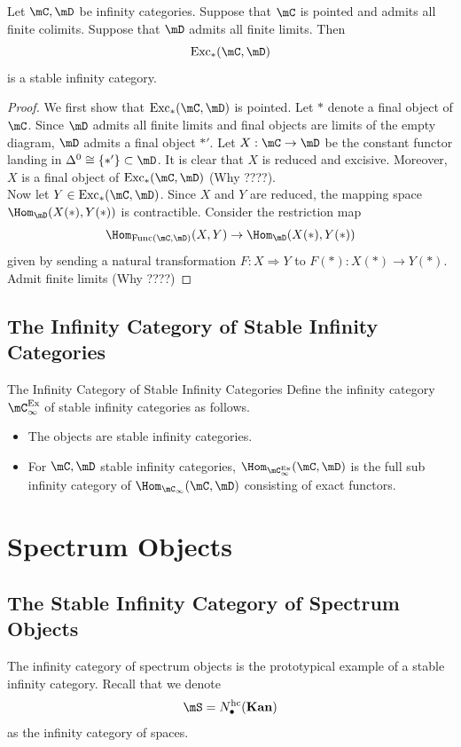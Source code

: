 \documentclass[a4paper]{article}
\begin{document}
\begin{prp}{}{} Let $\mC,\mD$ be infinity categories. Suppose that $\mC$ is pointed and admits all finite colimits. Suppose that $\mD$ admits all finite limits. Then $$\text{Exc}_\ast(\mC,\mD)$$ is a stable infinity category. 
\begin{proof}
We first show that $\text{Exc}_\ast(\mC,\mD)$ is pointed. Let $\ast$ denote a final object of $\mC$. Since $\mD$ admits all finite limits and final objects are limits of the empty diagram, $\mD$ admits a final object $\ast'$. Let $X:\mC\to\mD$ be the constant functor landing in $\Delta^0\cong\{\ast'\}\subset\mD$. It is clear that $X$ is reduced and excisive. Moreover, $X$ is a final object of $\text{Exc}_\ast(\mC,\mD)$ (Why ????). \\

Now let $Y\in\text{Exc}_\ast(\mC,\mD)$. Since $X$ and $Y$ are reduced, the mapping space $\Hom_\mD(X(\ast),Y(\ast))$ is contractible. Consider the restriction map $$\Hom_{\text{Func}(\mC,\mD)}(X,Y)\to\Hom_\mD(X(\ast),Y(\ast))$$ given by sending a natural transformation $F:X\Rightarrow Y$ to $F(\ast):X(\ast)\to Y(\ast)$. 
Admit finite limits (Why ????)
\end{proof}
\end{prp}

\subsection{The Infinity Category of Stable Infinity Categories}
\begin{defn}{The Infinity Category of Stable Infinity Categories}{} Define the infinity category $\mC_\infty^\text{Ex}$ of stable infinity categories as follows. 
\begin{itemize}
\item The objects are stable infinity categories. 
\item For $\mC,\mD$ stable infinity categories, $\Hom_{\mC_\infty^\text{Ex}}(\mC,\mD)$ is the full sub infinity category of $\Hom_{\mC_\infty}(\mC,\mD)$ consisting of exact functors. 
\end{itemize}
\end{defn}

\pagebreak
\section{Spectrum Objects}
\subsection{The Stable Infinity Category of Spectrum Objects}
The infinity category of spectrum objects is the prototypical example of a stable infinity category. 
Recall that we denote $$\mS=N_\bullet^\text{hc}(\bold{Kan})$$ as the infinity category of spaces. 
\end{document}
